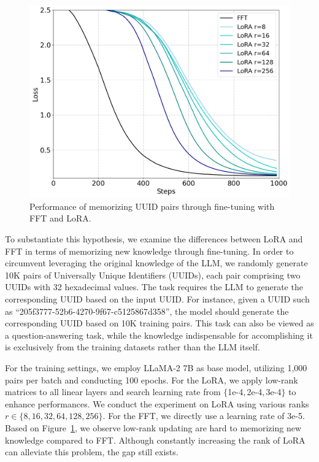 \documentclass[11pt]{article}
\begin{document}
 \begin{figure}[t]
     \centering
         \includegraphics[width=0.99\columnwidth]{fft-memory-lora.png}
     \caption{
       Performance of memorizing UUID pairs through fine-tuning with FFT and LoRA.
       }
     \label{fig:mtloss}
 \end{figure}
To substantiate this hypothesis, we examine the differences between LoRA and FFT in terms of memorizing new knowledge through fine-tuning. In order to circumvent leveraging the original knowledge of the LLM, we randomly generate 10K pairs of Universally Unique Identifiers (UUIDs), each pair comprising two UUIDs with 32 hexadecimal values. The task requires the LLM to generate the corresponding UUID based on the input UUID. For instance, given a UUID such as ``205f3777-52b6-4270-9f67-c5125867d358'', the model should generate the corresponding UUID based on 10K training pairs.
This task can also be viewed as a question-answering task, while the knowledge indispensable for accomplishing it is exclusively from the training datasets rather than the LLM itself.

For the training settings, we employ LLaMA-2 7B as base model, utilizing 1,000 pairs per batch and conducting 100 epochs. %
For the LoRA, we apply low-rank matrices to all linear layers and search learning rate from $\{$1e-4$,$2e-4$,$3e-4$\}$ to enhance performances.
We conduct the experiment on LoRA using various ranks $r \in \{8, 16, 32, 64, 128, 256\}$.
For the FFT, we directly use a learning rate of 3e-5.
Based on Figure~\ref{fig:mtloss}, we observe low-rank updating are hard to memorizing new knowledge compared to FFT.
Although constantly increasing the rank of LoRA can alleviate this problem, the gap still exists.
\end{document}
